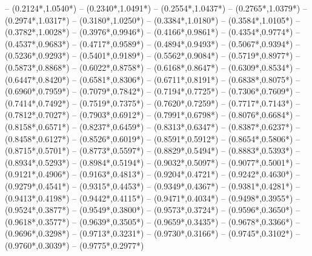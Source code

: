 {	-- ({0.2124*\dx},{1.0540*\dy})
	-- ({0.2340*\dx},{1.0491*\dy})
	-- ({0.2554*\dx},{1.0437*\dy})
	-- ({0.2765*\dx},{1.0379*\dy})
	-- ({0.2974*\dx},{1.0317*\dy})
	-- ({0.3180*\dx},{1.0250*\dy})
	-- ({0.3384*\dx},{1.0180*\dy})
	-- ({0.3584*\dx},{1.0105*\dy})
	-- ({0.3782*\dx},{1.0028*\dy})
	-- ({0.3976*\dx},{0.9946*\dy})
	-- ({0.4166*\dx},{0.9861*\dy})
	-- ({0.4354*\dx},{0.9774*\dy})
	-- ({0.4537*\dx},{0.9683*\dy})
	-- ({0.4717*\dx},{0.9589*\dy})
	-- ({0.4894*\dx},{0.9493*\dy})
	-- ({0.5067*\dx},{0.9394*\dy})
	-- ({0.5236*\dx},{0.9293*\dy})
	-- ({0.5401*\dx},{0.9189*\dy})
	-- ({0.5562*\dx},{0.9084*\dy})
	-- ({0.5719*\dx},{0.8977*\dy})
	-- ({0.5873*\dx},{0.8868*\dy})
	-- ({0.6022*\dx},{0.8758*\dy})
	-- ({0.6168*\dx},{0.8647*\dy})
	-- ({0.6309*\dx},{0.8534*\dy})
	-- ({0.6447*\dx},{0.8420*\dy})
	-- ({0.6581*\dx},{0.8306*\dy})
	-- ({0.6711*\dx},{0.8191*\dy})
	-- ({0.6838*\dx},{0.8075*\dy})
	-- ({0.6960*\dx},{0.7959*\dy})
	-- ({0.7079*\dx},{0.7842*\dy})
	-- ({0.7194*\dx},{0.7725*\dy})
	-- ({0.7306*\dx},{0.7609*\dy})
	-- ({0.7414*\dx},{0.7492*\dy})
	-- ({0.7519*\dx},{0.7375*\dy})
	-- ({0.7620*\dx},{0.7259*\dy})
	-- ({0.7717*\dx},{0.7143*\dy})
	-- ({0.7812*\dx},{0.7027*\dy})
	-- ({0.7903*\dx},{0.6912*\dy})
	-- ({0.7991*\dx},{0.6798*\dy})
	-- ({0.8076*\dx},{0.6684*\dy})
	-- ({0.8158*\dx},{0.6571*\dy})
	-- ({0.8237*\dx},{0.6459*\dy})
	-- ({0.8313*\dx},{0.6347*\dy})
	-- ({0.8387*\dx},{0.6237*\dy})
	-- ({0.8458*\dx},{0.6127*\dy})
	-- ({0.8526*\dx},{0.6019*\dy})
	-- ({0.8591*\dx},{0.5912*\dy})
	-- ({0.8654*\dx},{0.5806*\dy})
	-- ({0.8715*\dx},{0.5701*\dy})
	-- ({0.8773*\dx},{0.5597*\dy})
	-- ({0.8829*\dx},{0.5494*\dy})
	-- ({0.8883*\dx},{0.5393*\dy})
	-- ({0.8934*\dx},{0.5293*\dy})
	-- ({0.8984*\dx},{0.5194*\dy})
	-- ({0.9032*\dx},{0.5097*\dy})
	-- ({0.9077*\dx},{0.5001*\dy})
	-- ({0.9121*\dx},{0.4906*\dy})
	-- ({0.9163*\dx},{0.4813*\dy})
	-- ({0.9204*\dx},{0.4721*\dy})
	-- ({0.9242*\dx},{0.4630*\dy})
	-- ({0.9279*\dx},{0.4541*\dy})
	-- ({0.9315*\dx},{0.4453*\dy})
	-- ({0.9349*\dx},{0.4367*\dy})
	-- ({0.9381*\dx},{0.4281*\dy})
	-- ({0.9413*\dx},{0.4198*\dy})
	-- ({0.9442*\dx},{0.4115*\dy})
	-- ({0.9471*\dx},{0.4034*\dy})
	-- ({0.9498*\dx},{0.3955*\dy})
	-- ({0.9524*\dx},{0.3877*\dy})
	-- ({0.9549*\dx},{0.3800*\dy})
	-- ({0.9573*\dx},{0.3724*\dy})
	-- ({0.9596*\dx},{0.3650*\dy})
	-- ({0.9618*\dx},{0.3577*\dy})
	-- ({0.9639*\dx},{0.3505*\dy})
	-- ({0.9659*\dx},{0.3435*\dy})
	-- ({0.9678*\dx},{0.3366*\dy})
	-- ({0.9696*\dx},{0.3298*\dy})
	-- ({0.9713*\dx},{0.3231*\dy})
	-- ({0.9730*\dx},{0.3166*\dy})
	-- ({0.9745*\dx},{0.3102*\dy})
	-- ({0.9760*\dx},{0.3039*\dy})
	-- ({0.9775*\dx},{0.2977*\dy})
}
